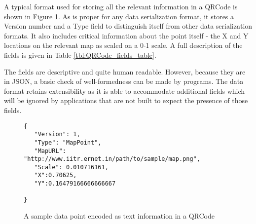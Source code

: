\documentclass[10pt,journal,letterpaper,compsoc]{IEEEtran}
\begin{document}
A typical format used for storing all the relevant information in a QRCode is
shown in Figure \ref{fig:QRCode_info_format}. As is proper for any data 
serialization format, it stores a Version number and a Type field to 
distinguish itself from other data serialization formats. It also includes
critical information about the point itself - the X and Y locations on 
the relevant map as scaled on a 0-1 scale. A full description of the fields
is given in Table \ref{tbl:QRCode_fields_table}.

The fields are descriptive 
and quite human readable. However, because they are in JSON, a basic 
check of well-formedness can be made by programs. The data format retains 
extensibility as it is able to accommodate additional fields which will
be ignored by applications that are not built to expect the presence of those
fields.

\begin{figure}
    \centering
\begin{verbatim}
{
   "Version": 1,
   "Type": "MapPoint",
   "MapURL": "http://www.iitr.ernet.in/path/to/sample/map.png",
   "Scale": 0.010716161,
   "X":0.70625,
   "Y":0.16479166666666667 
   
}
\end{verbatim}
    \caption{A sample data point encoded as text information in a QRCode\label{fig:QRCode_info_format}}
\end{figure}
\end{document}
